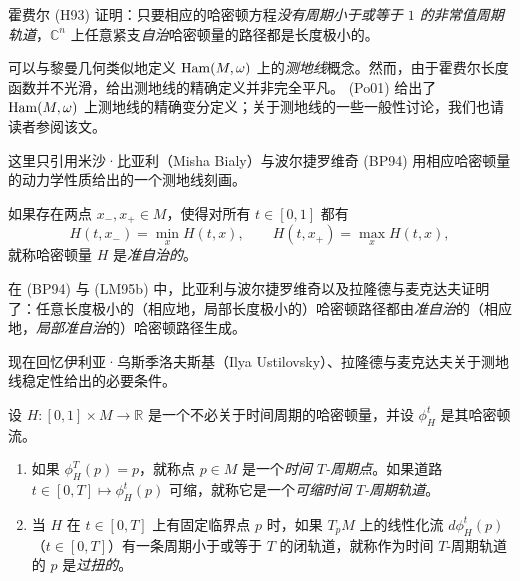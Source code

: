 霍费尔 (H93) 证明：只要相应的哈密顿方程\emph{没有周期小于或等于 $1$ 的非常值周期轨道}，$\mathbb C^n$ 上任意紧支\emph{自治}哈密顿量的路径都是长度极小的。

可以与黎曼几何类似地定义 $\operatorname{Ham}(M,\omega)$ 上的\emph{测地线}概念。然而，由于霍费尔长度函数并不光滑，给出测地线的精确定义并非完全平凡。
(Po01) 给出了 $\operatorname{Ham}(M,\omega)$ 上测地线的精确变分定义；关于测地线的一些一般性讨论，我们也请读者参阅该文。

这里只引用米沙·比亚利（Misha Bialy）与波尔捷罗维奇 (BP94) 用相应哈密顿量的动力学性质给出的一个测地线刻画。

\begin{definition}\label{def:quasi-autonomous-hamiltonian}
如果存在两点 $x_-,x_+\in M$，使得对所有 $t\in[0,1]$ 都有
\[
 H(t,x_-)=\min_xH(t,x),
 \qquad
 H(t,x_+)=\max_xH(t,x),
\]
就称哈密顿量 $H$ 是\emph{准自治的}。
\end{definition}

在 (BP94) 与 (LM95b) 中，比亚利与波尔捷罗维奇以及拉隆德与麦克达夫证明了：任意长度极小的（相应地，局部长度极小的）哈密顿路径都由\emph{准自治}的（相应地，\emph{局部准自治}的）哈密顿路径生成。

现在回忆伊利亚·乌斯季洛夫斯基（Ilya Ustilovsky）、拉隆德与麦克达夫关于测地线稳定性给出的必要条件。

\begin{definition}\label{def:over-twisted-periodic-orbit}
设 $H:[0,1]\times M\to\mathbb R$ 是一个不必关于时间周期的哈密顿量，并设 $\phi_H^t$ 是其哈密顿流。
\begin{enumerate}[label=(\arabic*)]
 \item 如果 $\phi_H^T(p)=p$，就称点 $p\in M$ 是一个\emph{时间
 $T$-周期点}。如果道路
 $t\in[0,T]\mapsto\phi_H^t(p)$ 可缩，就称它是一个\emph{可缩时间
 $T$-周期轨道}。
 \item 当 $H$ 在 $t\in[0,T]$ 上有固定临界点 $p$ 时，如果
 $T_pM$ 上的线性化流
 $d\phi_H^t(p)$（$t\in[0,T]$）有一条周期小于或等于 $T$ 的闭轨道，就称作为时间 $T$-周期轨道的 $p$ 是\emph{过扭的}。
\end{enumerate}
\end{definition}

